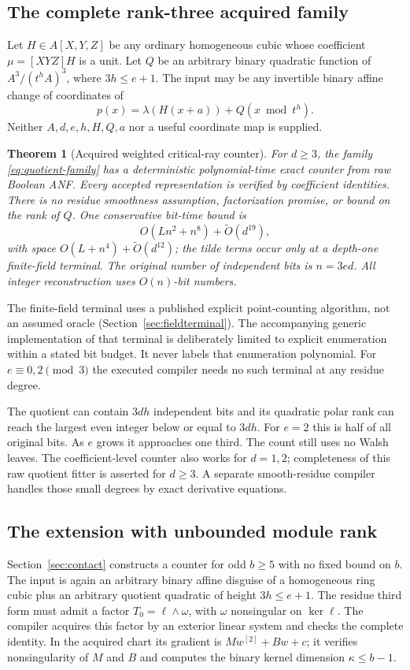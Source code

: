 \documentclass[11pt]{article}
\newtheorem{theorem}{Theorem}[section]\newtheorem{lemma}[theorem]{Lemma}
\theoremstyle{remark}\newtheorem{remark}[theorem]{Remark}
\begin{document}
\subsection{The complete rank-three acquired family}
Let $H\in A[X,Y,Z]$ be any ordinary homogeneous cubic whose coefficient
$\mu=[XYZ]H$ is a unit. Let $Q$ be an arbitrary binary quadratic function
of $A^3/(t^hA)^3$, where $3h\le e+1$. The input may be any invertible
binary affine change of coordinates of
\begin{equation}\label{eq:quotient-family}
 p(x)=\lambda(H(x+a))+Q(x\bmod t^h).
\end{equation}
Neither $A,d,e,h,H,Q,a$ nor a useful coordinate map is supplied.

\begin{theorem}[Acquired weighted critical-ray counter]\label{thm:quotient}
For $d\ge3$, the family \eqref{eq:quotient-family} has a deterministic
polynomial-time exact counter from raw Boolean ANF. Every accepted
representation is verified by coefficient identities. There is no residue
smoothness assumption, factorization promise, or bound on the rank of $Q$.
One conservative bit-time bound is
\[
 O(Ln^2+n^8)+\widetilde O(d^{19}),
\]
with space $O(L+n^4)+\widetilde O(d^{12})$; the tilde terms occur only at
a depth-one finite-field terminal. The original number of independent
bits is $n=3ed$. All integer reconstruction uses $O(n)$-bit numbers.
\end{theorem}
The finite-field terminal uses a published explicit point-counting
algorithm, not an assumed oracle (Section~\ref{sec:fieldterminal}).
The accompanying generic implementation of that terminal is deliberately
limited to explicit enumeration within a stated bit budget. It never
labels that enumeration polynomial. For $e\equiv0,2\pmod3$ the executed
compiler needs no such terminal at any residue degree.

The quotient can contain $3dh$ independent bits and its quadratic polar
rank can reach the largest even integer below or equal to $3dh$.
For $e=2$ this is half of all original bits. As $e$ grows it approaches
one third. The count still uses no Walsh leaves. The coefficient-level
counter also works for $d=1,2$; completeness of this raw quotient fitter
is asserted for $d\ge3$. A separate smooth-residue compiler handles
those small degrees by exact derivative equations.

\subsection{The extension with unbounded module rank}
Section~\ref{sec:contact} constructs a counter for odd $b\ge5$ with no
fixed bound on $b$. The input is again an arbitrary binary affine disguise
of a homogeneous ring cubic plus an arbitrary quotient quadratic of height
$3h\le e+1$. The residue third form must admit a factor
$T_0=\ell\wedge\omega$, with $\omega$ nonsingular on $\ker\ell$.
The compiler acquires this factor by an exterior linear system and checks
the complete identity. In the acquired chart its gradient is
$Mw^{[2]}+Bw+c$; it verifies nonsingularity of $M$ and $B$ and computes
the binary kernel dimension $\kappa\le b-1$.
\end{document}
